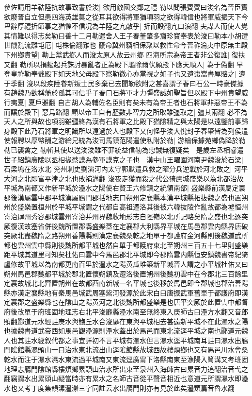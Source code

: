 參佐請用羊祜陸抗故事致書於浚|{
	欲用敵國交鄰之禮}
勒以問張賓賓曰浚名為晉臣實欲廢晉自立但患四海英雄莫之從耳其欲得將軍猶項羽之欲得韓信也將軍威振天下今卑辭厚禮折節事之猶懼不信况為羊陸之亢敵乎|{
	折而設翻亢口浪翻}
夫謀人而使人覺其情難以得志矣勒曰善十二月勒遣舍人王子春董肇多齎珍寶奉表於浚曰勒本小胡遭世饑亂流離屯厄|{
	屯株倫翻難也}
竄命冀州竊相保聚以救性命今晉祚淪夷中原無主殿下州鄉貴望|{
	勒上黨武鄉人而浚太原人故云州鄉}
四海所宗為帝王者非公復誰|{
	復扶又翻}
勒所以捐軀起兵誅討暴亂者正為殿下驅除爾伏願殿下應天順人|{
	為于偽翻}
早登皇祚勒奉戴殿下如天地父母殿下察勒微心亦當視之如子也又遺棗嵩書厚賂之|{
	遺于季翻}
浚以段疾陸眷新叛士民多棄已去聞勒欲附之甚喜謂子春曰石公一時豪傑據有趙魏乃欲稱藩於孤其可信乎子春曰石將軍才力彊盛誠如聖旨但以殿下中州貴望威行夷夏|{
	夏戶雅翻}
自古胡人為輔佐名臣則有矣未有為帝王者也石將軍非惡帝王不為而讓於殿下|{
	惡烏路翻}
顧以帝王自有歷數非智力之所取雖彊取之|{
	彊其兩翻}
必不為天人之所與故也項羽雖彊終為漢有石將軍之比殿下猶隂精之與太陽是以遠鑒前事歸身殿下此乃石將軍之明識所以遠過於人也殿下又何怪乎浚大悅封子春肇皆為列侯遣使報聘以厚幣酬之游綸兄統為浚司馬鎮范陽遣使私附於勒|{
	游綸保據苑鄉偽降於勒勒已襲禽之}
勒斬其使以送浚浚雖不罪統益信勒為忠誠無復疑矣　是歲左丞相睿遣世子紹鎮廣陵以丞相掾蔡謨為參軍謨克之子也　漢中山王曜圍河南尹魏浚於石梁|{
	石梁塢在洛水北}
兖州刺史劉演河内太守郭默遣兵救之曜分兵逆戰於河北敗之|{
	河平大河之北即富平津之北也敗補邁翻}
浚夜走獲而殺之代公猗盧城盛樂以為北都治故平城為南都又作新平城於灅水之陽使右賢王六修鎮之統領南部|{
	盛樂縣前漢屬定襄郡後漢屬雲中郡平城漢屬鴈門郡括地志曰朔州定襄縣本漢平城縣拓抜魏之盛也置朔州於盛樂置桓州於平城平城謂之代都自高祖遷洛其後被六韓抜陵作亂故都為墟恒州寄治肆州秀容郡城雲州寄治并州界魏收地形志自陘嶺以北所記略矣隋之盛也北逐突厥復漢故塞省併後魏所置郡縣盛樂蓋在定襄郡大利縣界平城在馬邑郡雲内縣界唐破突厥北盡魏隋之路朔州善陽縣則漢定襄魏桑乾之地單于都護府金河縣則後魏道武所都也雲州雲中縣則後魏所都平城也然自單于都護府東北至朔州三百五十七里則盛樂距平城其道里可知矣杜佑曰雲中今馬邑郡北平城即今郡隋雲内縣恒安鎮魏書帝紀猗盧修故平城以為南都更南百里於灅水之陽黄瓜堆築新平城晉人謂之小平城杜佑又曰朔州馬邑郡魏都平城於郡北置懷朔鎮及遷洛後置朔州後魏初雲中在今郡北三百餘里定襄故城北北齊置朔州在故都西南新城一名平城也後移於馬邑即今郡城也郡治善陽縣亦漢定襄縣地有秦馬邑城武周塞紫河發源於此宋白曰唐振武軍舊單于都護府即漢定襄郡之盛樂縣也在隂山之陽黄河之北後魏所都盛樂是也唐平突厥於此置雲中都督府後改單于府班固地理志右北平浚靡縣灅水南至無終東入庚師古曰灅方水翻又音郎賄翻酈道元水經註庚水與鮑丘水合浚靡在東與平城相去甚遠新平城不在此灅水之陽也據魏書道武帝西如馬邑觀灅源則灅水蓋出於馬邑而東北流逕平城之南也酈道元魏人也其註水經叙代都之事宜詳初不言平城有灅水但言濕水逕平城南耳註曰濕水出鴈門隂館縣濕頭山一曰治水東北流出山逕隂館縣故城西故樓煩鄉也又有馬邑川水會桑乾水而注于濕水濕水東流過平城南又東流逕廣甯下洛縣南東至漁陽入笥溝又考班固地理志鴈門隂館縣樓煩鄉累頭山治水所出東至泉州入海師古曰累音力追翻治音弋之翻竊謂水出累頭山疑當時亦有累水之名師古音從平聲音相近也意道元所謂濕水即灅水也又考丁度集韻漯灅㶟三字同註云水出鴈門則亦有見於此矣灅類篇音魯水翻}


